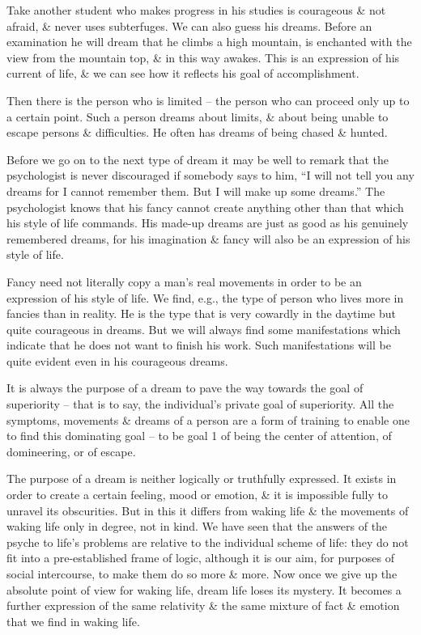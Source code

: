 \documentclass{article}
\numberwithin{equation}{section}
\begin{document}
Take another student who makes progress in his studies is courageous \& not afraid, \& never uses subterfuges. We can also guess his dreams. Before an examination he will dream that he climbs a high mountain, is enchanted with the view from the mountain top, \& in this way awakes. This is an expression of his current of life, \& we can see how it reflects his goal of accomplishment.

Then there is the person who is limited -- the person who can proceed only up to a certain point. Such a person dreams about limits, \& about being unable to escape persons \& difficulties. He often has dreams of being chased \& hunted.

Before we go on to the next type of dream it may be well to remark that the psychologist is never discouraged if somebody says to him, ``I will not tell you any dreams for I cannot remember them. But I will make up some dreams.'' The psychologist knows that his fancy cannot create anything other than that which his style of life commands. His made-up dreams are just as good as his genuinely remembered dreams, for his imagination \& fancy will also be an expression of his style of life.

Fancy need not literally copy a man's real movements in order to be an expression of his style of life. We find, e.g., the type of person who lives more in fancies than in reality. He is the type that is very cowardly in the daytime but quite courageous in dreams. But we will always find some manifestations which indicate that he does not want to finish his work. Such manifestations will be quite evident even in his courageous dreams.

It is always the purpose of a dream to pave the way towards the goal of superiority -- that is to say, the individual's private goal of superiority. All the symptoms, movements \& dreams of a person are a form of training to enable one to find this dominating goal -- to be goal 1 of being the center of attention, of domineering, or of escape.

The purpose of a dream is neither logically or truthfully expressed. It exists in order to create a certain feeling, mood or emotion, \& it is impossible fully to unravel its obscurities. But in this it differs from waking life \& the movements of waking life only in degree, not in kind. We have seen that the answers of the psyche to life's problems are relative to the individual scheme of life: they do not fit into a pre-established frame of logic, although it is our aim, for purposes of social intercourse, to make them do so more \& more. Now once we give up the absolute point of view for waking life, dream life loses its mystery. It becomes a further expression of the same relativity \& the same mixture of fact \& emotion that we find in waking life.
\end{document}
